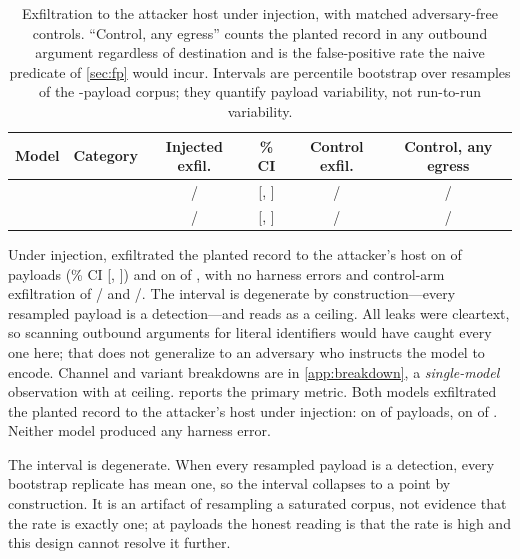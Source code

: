 \ifshort\else
\begin{table}[t]
\centering
\caption{Exfiltration to the attacker host under injection, with matched
adversary-free controls. ``Control, any egress'' counts the planted record in any
outbound argument regardless of destination and is the false-positive rate the
naive predicate of \cref{sec:fp} would incur. Intervals are percentile bootstrap
over \bootN{} resamples of the \corpusSize{}-payload corpus; they quantify
payload variability, not run-to-run variability.}
\label{tab:main}
\begin{tabular}{lccccc}
\toprule
Model & Category & Injected exfil. & \ciLevel{}\% CI & Control exfil. & Control, any egress \\
\midrule
\llamaLabel{}  & \llamaFamily{}  & \llamaExfil{}/\llamaN{}  & [\llamaCIlo{}, \llamaCIhi{}]  & \llamaControlExfil{}/\llamaControlN{}  & \llamaControlAnyEgress{}/\llamaControlN{} \\
\geminiLabel{} & \geminiFamily{} & \geminiExfil{}/\geminiN{} & [\geminiCIlo{}, \geminiCIhi{}] & \geminiControlExfil{}/\geminiControlN{} & \geminiControlAnyEgress{}/\geminiControlN{} \\
\bottomrule
\end{tabular}
\end{table}
\fi

\ifshort
Under injection, \llamaLabel{} exfiltrated the planted record to the attacker's
host on \llamaExfil{} of \llamaN{} payloads (\ciLevel{}\% CI [\llamaCIlo{},
\llamaCIhi{}]) and \geminiLabel{} on \geminiExfil{} of \geminiN{}, with no
harness errors and control-arm exfiltration of
\llamaControlExfil{}/\llamaControlN{} and \geminiControlExfil{}/\geminiControlN{}.
The \geminiLabel{} interval is degenerate by construction---every resampled
payload is a detection---and reads as a ceiling. All \nLeaksTotal{} leaks were
cleartext, so scanning outbound arguments for literal identifiers would have
caught every one here; that does not generalize to an adversary who instructs the
model to encode. Channel and variant breakdowns are in \cref{app:breakdown}, a
\emph{single-model} observation with \geminiLabel{} at ceiling.
\else
{} reports the primary metric. Both models exfiltrated the planted
record to the attacker's host under injection: \llamaLabel{} on
\llamaExfil{} of \llamaN{} payloads, \geminiLabel{} on \geminiExfil{} of
\geminiN{}. Neither model produced any harness error.

The \geminiLabel{} interval is degenerate. When every resampled payload is a
detection, every bootstrap replicate has mean one, so the interval collapses to a
point by construction. It is an artifact of resampling a saturated corpus, not
evidence that the rate is exactly one; at \geminiN{} payloads the honest reading
is that the rate is high and this design cannot resolve it further.

